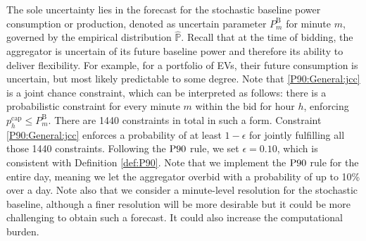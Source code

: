 \documentclass[conference]{IEEEtran}
\begin{document}
The sole uncertainty lies in the forecast for the stochastic baseline power consumption or production, denoted as uncertain parameter $P_{m}^{\text{B}}$ for minute $m$, governed by the empirical distribution $\hat{\mathbb{P}}$. Recall that at the time of bidding, the aggregator is uncertain of its future baseline power and therefore its ability to deliver flexibility. For example, for a portfolio of \acp{EV}, their future consumption is uncertain, but most likely predictable to some degree. Note that \eqref{P90:General:jcc} is a joint chance constraint, which can be interpreted as follows: there is a probabilistic constraint for every minute $m$ within the bid for hour $h$, enforcing $p_{h}^{\text{cap}} \leq P_{m}^{\text{B}}$. There are 1440 constraints in total in such a form. Constraint \eqref{P90:General:jcc} enforces a probability of at least $1-\epsilon$ for jointly fulfilling all those 1440 constraints. Following the $\rm{P90}$ rule, we set $\epsilon\!=\!0.10$, which is consistent with Definition \ref{def:P90}. Note that we implement the $\rm{P90}$ rule for the entire day, meaning we let the aggregator overbid with a probability of up to 10\% over a day. Note also that we consider a minute-level resolution for the stochastic baseline, although a finer resolution will be more desirable but it could be more challenging to obtain such a forecast. It could also increase the computational burden. 


\end{document}
